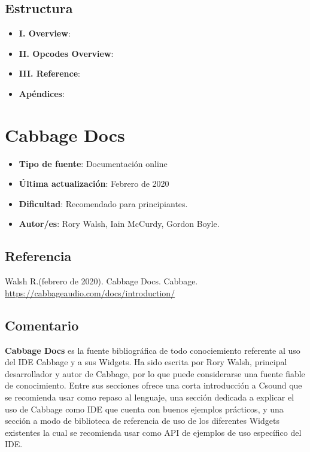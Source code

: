 \subsection{Estructura}

 \begin{itemize}
 \item \textbf{I. Overview}:
 
 \item \textbf{II. Opcodes Overview}:
 
 \item \textbf{III. Reference}:
 
 \item \textbf{Apéndices}: 
 \end{itemize}

\section{Cabbage Docs}

 \begin{itemize}
 \item \textbf{Tipo de fuente}: Documentación online
 
 \item \textbf{Última actualización}: Febrero de 2020
 
 \item \textbf{Dificultad}: Recomendado para principiantes.
 
 \item \textbf{Autor/es}: Rory Walsh, Iain McCurdy, Gordon Boyle.
 \end{itemize}

\subsection{Referencia}

Walsh R.(febrero de 2020). Cabbage Docs. Cabbage. \url{https://cabbageaudio.com/docs/introduction/}

\subsection{Comentario}

\textbf{Cabbage Docs} es la fuente bibliográfica de todo conociemiento referente al uso del IDE Cabbage y a sus Widgets. Ha sido escrita por Rory Walsh, principal desarrollador y autor de Cabbage, por lo que puede considerarse una fuente fiable de conocimiento.
Entre sus secciones ofrece una corta introducción a Csound que se recomienda usar como repaso al lenguaje, una sección dedicada a explicar el uso de Cabbage como IDE que cuenta con buenos ejemplos prácticos, y una sección a modo de biblioteca de referencia de uso de los diferentes Widgets existentes la cual se recomienda usar como API de ejemplos de uso específico del IDE.

